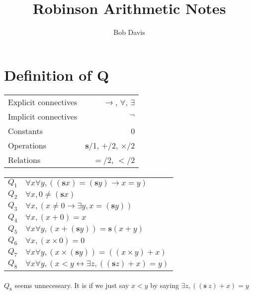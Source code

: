 \documentclass{article}
\title{Robinson Arithmetic Notes}
\author{Bob Davis}
\begin{document}
\maketitle
\newpage
\section{Definition of Q}

\paragraph{}
\begin{tabular}{l | r}
 \hline
 Explicit connectives & $\rightarrow$, $\forall$, $\exists$ \\
 Implicit connectives & $\neg$ \\
 Constants & 0 \\
 Operations & $\mathbf{s}$/1, $+$/2, $\times$/2 \\
 Relations & $=$/2, $<$/2\\
 \hline
\end{tabular}



\paragraph{}
\begin{tabular}{l l}
 $Q_{1}$ & $\forall x \forall y, ((\mathbf{s} x) = (\mathbf{s} y) \rightarrow x = y)$ \\
 $Q_{2}$ & $\forall x, 0 \ne (\mathbf{s} x)$ \\
 $Q_{3}$ & $\forall x, (x \ne 0 \rightarrow \exists y, x = (\mathbf{s} y))$ \\
 $Q_{4}$ & $\forall x, (x + 0) = x$ \\
 $Q_{5}$ & $\forall x \forall y,(x + (\mathbf{s} y)) = \mathbf{s} (x + y)$ \\
 $Q_{6}$ & $\forall x, (x \times 0) = 0$ \\
 $Q_{7}$ & $\forall x \forall y, (x \times (\mathbf{s} y)) = ((x \times y) + x)$ \\
 $Q_{8}$ & $\forall x \forall y, (x < y \leftrightarrow \exists z , ((\mathbf{s} z) + x) = y)$
\end{tabular}

\paragraph{}
$Q_{8}$ seems unnecessary. It is if we just say $x < y$ by saying $\exists z , ((\mathbf{s}\ z) + x) = y$
\end{document}
